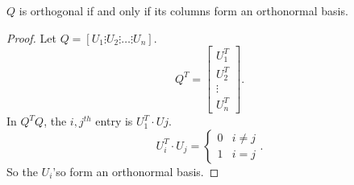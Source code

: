   \begin{prop}
    $Q$ is orthogonal if and only if its columns form an orthonormal basis.
    \begin{proof}
      Let $Q=[U_1\vdots U_2 \vdots\ldots\vdots U_n]$.
      \[
      Q^{T}=\begin{bmatrix} U_1^{T}\\U_2^{T}\\ \vdots \\ U_n^{T} \end{bmatrix} 
      .\] 
      In $Q^{T}Q$, the $i,j^{th}$ entry is $U_1^{T}\cdot Uj$.
      \[
      U_i^{T}\cdot U_j =
      \begin{cases}
        0&i\neq j\\
        1&i=j
      \end{cases}
      .\] 
      So the $U_i$'so form an orthonormal basis.
    \end{proof}
  \end{prop}
